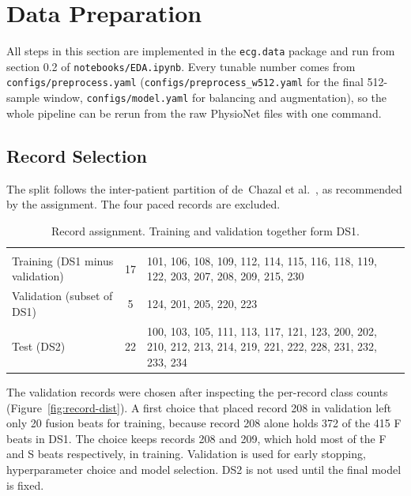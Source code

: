 \section{Data Preparation}
\label{sec:data-preparation}

All steps in this section are implemented in the \texttt{ecg.data} package and run from section 0.2 of \texttt{notebooks/EDA.ipynb}. Every tunable number comes from \texttt{configs/preprocess.yaml} (\texttt{configs/preprocess\_w512.yaml} for the final 512-sample window, \texttt{configs/model.yaml} for balancing and augmentation), so the whole pipeline can be rerun from the raw PhysioNet files with one command.

\subsection{Record Selection}
\label{sec:record-selection}

The split follows the inter-patient partition of de~Chazal et al.~\cite{dechazal2004}, as recommended by the assignment. The four paced records are excluded.

\begin{table}[H]
  \centering
  \caption{Record assignment. Training and validation together form DS1.}
  \label{tab:records}
  \begin{tabularx}{\linewidth}{l c Y}
     &  &  \\
    Training (DS1 minus validation) & 17 & 101, 106, 108, 109, 112, 114, 115, 116, 118, 119, 122, 203, 207, 208, 209, 215, 230 \\
    Validation (subset of DS1)      & 5  & 124, 201, 205, 220, 223 \\
    Test (DS2)                      & 22 & 100, 103, 105, 111, 113, 117, 121, 123, 200, 202, 210, 212, 213, 214, 219, 221, 222, 228, 231, 232, 233, 234 \\
    \bottomrule
  \end{tabularx}

\end{table}

The validation records were chosen after inspecting the per-record class counts (Figure~\ref{fig:record-dist}). A first choice that placed record 208 in validation left only 20 fusion beats for training, because record 208 alone holds 372 of the 415 F beats in DS1. The choice keeps records 208 and 209, which hold most of the F and S beats respectively, in training. Validation is used for early stopping, hyperparameter choice and model selection. DS2 is not used until the final model is fixed.

